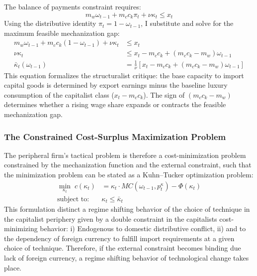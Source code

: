 The balance of payments constraint requires:
\begin{equation}
	m_w \omega_{t-1} + m_c c_k \pi_t + \nu \kappa_t \le x_t
	\label{eq:33:bop_full}
\end{equation}
Using the distributive identity $\pi_t = 1 - \omega_{t-1}$,
I substitute and solve for the maximum feasible mechanization
gap:
\begin{align}
	m_w \omega_{t-1} + m_c c_k (1 - \omega_{t-1})
	+ \nu \kappa_t &\le x_t
	\label{eq:33:bop_sub} \\
	\nu \kappa_t &\le x_t - m_c c_k
	+ (m_c c_k - m_w) \omega_{t-1}
	\label{eq:33:bop_solved} \\
	\bar{\kappa}_t(\omega_{t-1})
	&= \frac{1}{\nu} \left[ x_t - m_c c_k
	+ (m_c c_k - m_w) \omega_{t-1} \right]
	\label{eq:33:kappa_bar}
\end{align}
This equation formalizes the structuralist critique: the base
capacity to import capital goods is determined by export
earnings minus the baseline luxury consumption of the
capitalist class ($x_t - m_c c_k$). The sign of
$(m_c c_k - m_w)$ determines whether a rising wage share
expands or contracts the feasible mechanization gap.

\subsubsection{The Constrained Cost-Surplus Maximization
	Problem}

The peripheral firm's tactical problem is therefore a cost-minimization problem constrained by the mechanization function and the external constraint, such that the minimization problem can be stated as a Kuhn–Tucker optimization problem: 
\begin{align}
	\min_{\kappa_t}\; c(\kappa_t)
	&=  \kappa_t \cdot MC(\omega_{t-1}, p^\kappa_t) - \Phi(\kappa_t)
	\label{eq:33:constrained_obj} \\
	\text{subject to:}\quad & \kappa_t \le \bar{\kappa}_t
	\label{eq:33:constraint}
\end{align}
This formulation distinct a regime shifting behavior of the choice of technique in the capitalist periphery given by a double constraint in the capitalists cost-minimizing behavior: i) Endogenous to domestic distributive conflict, ii) and to the dependency of foreign currency to fulfill import requirements at a given choice of technique. Therefore, if the external constraint becomes binding due lack of foreign currency, a regime shifting behavior of technological change takes place. 

